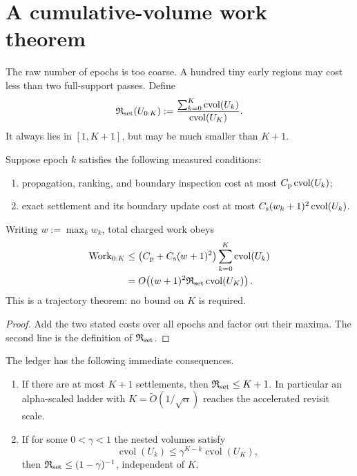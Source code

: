 \section{A cumulative-volume work theorem}
\label{sec:work}

The raw number of epochs is too coarse.  A hundred tiny early regions may
cost less than two full-support passes.  Define
\begin{equation}
 \mathfrak R_{\rm set}(U_{0:K})
 :=\frac{\sum_{k=0}^K\operatorname{cvol}(U_k)}
          {\operatorname{cvol}(U_K)}.
 \label{eq:settled-revisit-factor}
\end{equation}
It always lies in $[1,K+1]$, but may be much smaller than $K+1$.

\begin{theorem}
\label{thm:propagate-settle-work}
Suppose epoch $k$ satisfies the following measured conditions:
\begin{enumerate}[label=(\roman*),leftmargin=*]
 \item propagation, ranking, and boundary inspection cost at most
 $C_{\rm p}\operatorname{cvol}(U_k)$;
 \item exact settlement and its boundary update cost at most
 $C_{\rm s}(w_k+1)^2\operatorname{cvol}(U_k)$.
\end{enumerate}
Writing $w:=\max_kw_k$, total charged work obeys
\begin{align}
 \operatorname{Work}_{0:K}
 &\leq
 \bigl(C_{\rm p}+C_{\rm s}(w+1)^2\bigr)
 \sum_{k=0}^K\operatorname{cvol}(U_k)
 \notag\\
 &=O\!\left(
  (w+1)^2\mathfrak R_{\rm set}
  \operatorname{cvol}(U_K)
 \right).
 \label{eq:propagate-settle-work}
\end{align}
This is a trajectory theorem: no bound on $K$ is required.
\end{theorem}

\begin{proof}
Add the two stated costs over all epochs and factor out their maxima.  The
second line is the definition of $\mathfrak R_{\rm set}$.
\end{proof}

\begin{corollary}
\label{cor:revisit-regimes}
The ledger has the following immediate consequences.
\begin{enumerate}[label=(\roman*),leftmargin=*]
 \item If there are at most $K+1$ settlements, then
 $\mathfrak R_{\rm set}\leq K+1$.  In particular an alpha-scaled ladder with
 $K=\widetilde O(1/\sqrt\alpha)$ reaches the accelerated revisit scale.
 \item If for some $0<\gamma<1$ the nested volumes satisfy
 \begin{equation}
  \operatorname{cvol}(U_k)
  \leq\gamma^{K-k}\operatorname{cvol}(U_K),
  \label{eq:geometric-volume-growth}
 \end{equation}
 then $\mathfrak R_{\rm set}\leq(1-\gamma)^{-1}$, independent of $K$.
\end{enumerate}
\end{corollary}

